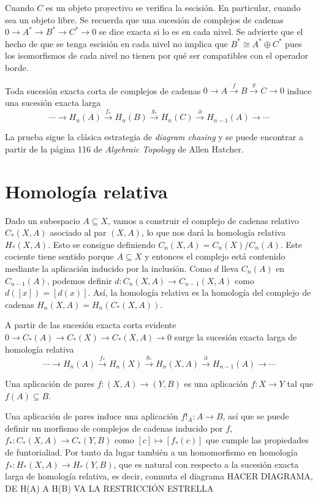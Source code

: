 \documentclass[TA.tex]{subfiles}
\begin{document}
Cuando $C$ es un objeto proyectivo se verifica la escisión. En particular, cuando sea un objeto libre. Se recuerda que una sucesión de complejos  de cadenas $0\to A^*\to B^*\to C^*\to 0$ se dice exacta si lo es en cada nivel. Se advierte que el hecho de que se tenga escisión en cada nivel no implica que $B^*\cong A^*\oplus C^*$ pues los isomorfismos de cada nivel no tienen por qué ser compatibles con el operador borde. 

\begin{teorema}
Toda sucesión exacta corta de complejos de cadenas $0\to A\xrightarrow{f} B\xrightarrow{g} C\to 0$ induce una sucesión exacta larga
\[
\cdots \to H_n(A)\xrightarrow{f_*}H_n(B)\xrightarrow{g_*}H_n(C)\xrightarrow{\partial}H_{n-1}(A)\to\cdots
\] 
\end{teorema}
La prueba sigue la clásica estrategia de \emph{diagram chasing} y se puede encontrar a partir de la página 116 de \emph{Algebraic Topology} de Allen Hatcher. 
\section{Homología relativa}

Dado un subespacio $A\subseteq X$, vamos a construir el complejo de cadenas relativo $C_*(X,A)$ asociado al par $(X,A)$, lo que nos dará la homología relativa $H_*(X,A)$. Esto se consigue definiendo $C_n(X,A)=C_n(X)/C_n(A)$. Este cociente tiene sentido porque $A\subseteq X$ y entonces el complejo está contenido mediante la aplicación inducido por la inclusión. Como $d$ lleva $C_n(A)$ en $C_{n-1}(A)$, podemos definir $d:C_n(X,A)\to C_{n-1}(X,A)$ como $d([x])=[d(x)]$. Así, la homología relativa es la homología del complejo de cadenas $H_n(X,A)=H_n(C_*(X,A))$. 

A partir de las sucesión exacta corta evidente $0\to C_*(A)\to C_*(X)\to C_*(X,A)\to 0$ surge la sucesión exacta larga de homología relativa
\[
\cdots \to H_n(A)\xrightarrow{f_*}H_n(X)\xrightarrow{g_*}H_n(X,A)\xrightarrow{\partial}H_{n-1}(A)\to\cdots
\]

\begin{defi}
Una aplicación de pares $f:(X,A)\to (Y,B)$ es una aplicación $f:X\to Y$ tal que $f(A)\subseteq B$. 
\end{defi}

Una aplicación de pares induce una aplicación $f!_A:A\to B$, así que se puede definir un morfismo de complejos de cadenas inducido por $f$, $f_*:C_*(X,A)\to C_*(Y,B)$ como $[c]\mapsto [f_*(c)]$ que cumple las propiedades de funtorialiad. Por tanto da lugar también a un homomorfismo en homología $f_*:H_*(X,A)\to H_*(Y,B)$, que es natural con respecto a la sucesión exacta larga de homología relativa, es decir, conmuta el diagrama HACER DIAGRAMA, DE H(A) A H(B) VA LA RESTRICCIÓN ESTRELLA
\end{document}
